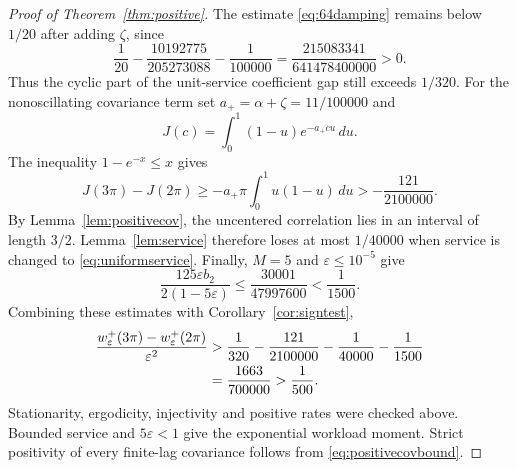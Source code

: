 \documentclass[aap,preprint]{imsart}
\numberwithin{equation}{section}
\theoremstyle{plain}
\theoremstyle{definition}
\newcommand{\1}{\mathbf 1}
\newcommand{\eps}{\varepsilon}
\begin{document}
\begin{proof}[Proof of Theorem~\ref{thm:positive}]
The estimate \eqref{eq:64damping} remains below $1/20$ after adding $\zeta$, since
\[
 \frac1{20}-\frac{10192775}{205273088}-\frac1{100000}
 =\frac{215083341}{641478400000}>0.
\]
Thus the cyclic part of the unit-service coefficient gap still exceeds $1/320$. For the nonoscillating covariance term set $a_+=\alpha+\zeta=11/100000$ and
\[
 J(c)=\int_0^1(1-u)e^{-a_+cu}\,du.
\]
The inequality $1-e^{-x}\le x$ gives
\[
 J(3\pi)-J(2\pi)\ge-a_+\pi\int_0^1u(1-u)\,du
 >-\frac{121}{2100000}.
\]
By Lemma~\ref{lem:positivecov}, the uncentered correlation lies in an interval of length $3/2$. Lemma~\ref{lem:service} therefore loses at most $1/40000$ when service is changed to \eqref{eq:uniformservice}. Finally, $M=5$ and $\eps\le10^{-5}$ give
\[
 \frac{125\eps b_2}{2(1-5\eps)}
 \le\frac{30001}{47997600}<\frac1{1500}.
\]
Combining these estimates with Corollary~\ref{cor:signtest},
\begin{align}\label{eq:positivemargin}
 \frac{w^+_\eps(3\pi)-w^+_\eps(2\pi)}{\eps^2}
 &>\frac1{320}-\frac{121}{2100000}-\frac1{40000}-\frac1{1500}\notag\\
 &=\frac{1663}{700000}>\frac1{500}.
\end{align}
Stationarity, ergodicity, injectivity and positive rates were checked above. Bounded service and $5\eps<1$ give the exponential workload moment. Strict positivity of every finite-lag covariance follows from \eqref{eq:positivecovbound}.
\end{proof}
\end{document}
